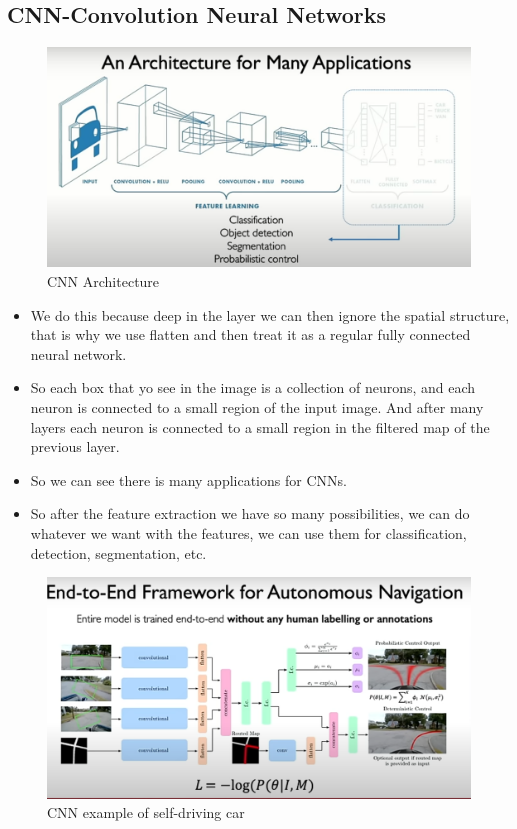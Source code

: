 \documentclass{article}
\begin{document}
\subsection*{CNN-Convolution Neural Networks}
\begin{figure}[H]
  \centering
  \includegraphics[width=\textwidth]{Images/cnn.png}
  \caption{CNN Architecture}
\end{figure}
\begin{itemize}
  \item We do this because deep in the layer we can then ignore the spatial structure, that is why we use flatten and then treat it as a regular fully connected neural network.
  \item So each box that yo see in the image is a collection of neurons, and each neuron is connected to a small region of the input image. And after many layers each neuron is connected to a small region in the filtered map of the previous layer.
  \item So we can see there is many applications for CNNs.
  \item So after the feature extraction we have so many possibilities, we can do whatever we want with the features, we can use them for classification, detection, segmentation, etc.
\end{itemize}
\begin{figure}[H]
  \centering
  \includegraphics[width = \textwidth]{Images/cnn3.png}
  \caption{CNN example of self-driving car}
\end{figure}
\end{document}

